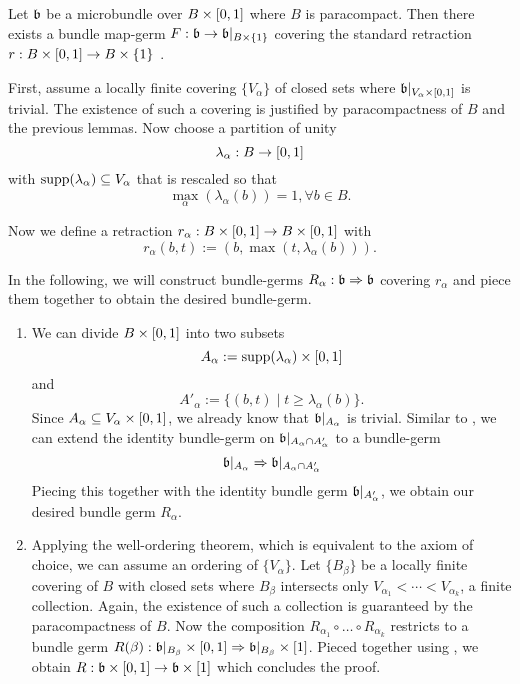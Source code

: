 \begin{scope}
\begin{mylemma}\label{homotopy::lemma3}
    Let $\bb$ be a microbundle over $B \times \I$ where $B$ is paracompact.
    Then there exists a bundle map-germ $F: \bb \to \bb\restr{B \times \{1\}}$
    covering the standard retraction $r: B \times \I \to B \times \{1\}$ .
\end{mylemma}
\begin{myproof}
    First, assume a locally finite covering $\{V_\alpha\}$ of closed sets where $\bb\restr{V_\alpha \times \I}$ is trivial.
    The existence of such a covering is justified by paracompactness of $B$ and the previous lemmas.
    Now choose a partition of unity
    \[ \lambda_\alpha: B \to \I \]
    with $\text{supp}(\lambda_\alpha) \sub V_\alpha$ that is rescaled so that
    \[ \max_{\alpha}(\lambda_\alpha(b)) = 1, \forall b \in B. \]
    
    Now we define a retraction $r_\alpha: B \times \I \to B \times \I$ with
    \[ r_\alpha(b, t) := (b, \max(t, \lambda_\alpha(b))). \]

    In the following, we will construct bundle-germs $R_\alpha: \bb \double \bb$ covering $r_\alpha$
    and piece them together to obtain the desired bundle-germ.
    \begin{enumerate}
        \item 
        We can divide $B \times \I$ into two subsets
        \[ A_\alpha := \text{supp}(\lambda_\alpha) \times \I \]
        and
        \[ A'_\alpha := \{(b, t) \mid t \ge \lambda_\alpha(b)\}. \]
        Since $A_\alpha \sub V_\alpha \times \I$, we already know that $\bb\restr{A_\alpha}$ is trivial.
        Similar to , we can extend the identity bundle-germ on $\bb\restr{\A \cap \A[']}$ to a bundle-germ
        \[ \bb\restr{\A} \double \bb\restr{\A \cap \A[']} \]
        Piecing this together with the identity bundle germ $\bb\restr{\A[']}$, we obtain our desired bundle germ $R_\alpha$.
        
        \item
        Applying the well-ordering theorem, which is equivalent to the axiom of choice, we can assume an ordering of $\{ V_\alpha \}$.
        Let $\{B_\beta\}$ be a locally finite covering of $B$ with closed sets where $B_\beta$ intersects only $V_{\alpha_1} < \cdots < V_{\alpha_k}$, a finite collection.
        Again, the existence of such a collection is guaranteed by the paracompactness of $B$. 
        Now the composition $R_{\alpha_1} \circ \ldots \circ R_{\alpha_k}$ restricts to a bundle germ $R(\beta): \bb\restr{B_\beta} \times \I \double \bb\restr{B_\beta} \times [1]$.
        Pieced together using , we obtain $R: \bb \times \I\to \bb \times [1]$ which concludes the proof.
    \end{enumerate}    
\end{myproof}


\end{scope}

